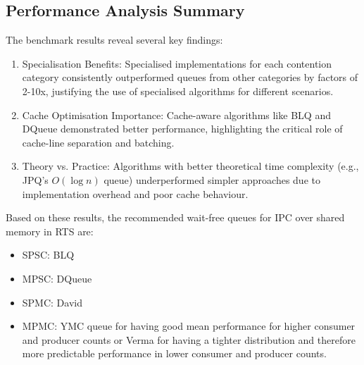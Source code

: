 \subsection{Performance Analysis Summary}
The benchmark results reveal several key findings:

\begin{enumerate}
\item Specialisation Benefits: Specialised implementations for each contention category consistently outperformed queues from other categories by factors of 2-10x, justifying the use of specialised algorithms for different scenarios.

\item Cache Optimisation Importance: Cache-aware algorithms like \ac{BLQ} and DQueue demonstrated better performance, highlighting the critical role of cache-line separation and batching.

\item Theory vs. Practice: Algorithms with better theoretical time complexity (e.g., \ac{JPQ}'s $O(\log n)$ queue) underperformed simpler approaches due to implementation overhead and poor cache behaviour.
\end{enumerate}

Based on these results, the recommended wait-free queues for \ac{IPC} over shared memory in \ac{RTS} are:
\begin{itemize}
\item \ac{SPSC}: \ac{BLQ}
\item \ac{MPSC}: DQueue
\item \ac{SPMC}: David
\item \ac{MPMC}: \ac{YMC} queue for having good mean performance for higher consumer and producer counts or Verma for having a tighter distribution and therefore more predictable performance in lower consumer and producer counts.
\end{itemize}